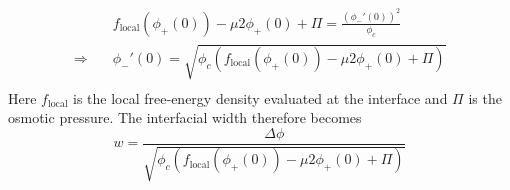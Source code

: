 \documentclass[12pt]{article}
\begin{document}
\[
\begin{aligned}
    &f_\mathrm{local}(\phi_+(0)) - \mu 2\phi_+(0) + \Pi =\frac{(\phi_-'(0))^2}{\phi_c}\\
    \Rightarrow\quad&\phi_-'(0) = \sqrt{\phi_c \left(f_\mathrm{local}(\phi_+(0)) - \mu 2\phi_+(0) + \Pi\right)}\\
\end{aligned}
\]
Here \(f_\mathrm{local}\) is the local free-energy density evaluated at the interface and \(\Pi\) is the osmotic pressure. The interfacial width therefore becomes
\begin{equation}
    w = \frac{\Delta \phi}{\sqrt{\phi_c \left(f_\mathrm{local}(\phi_+(0)) - \mu 2\phi_+(0) + \Pi\right)}}
\end{equation}
\end{document}
